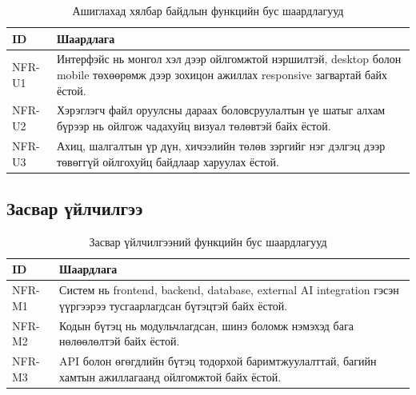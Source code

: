 \begin{table}[H]
\centering
\begin{tabular}{|p{3cm}|p{11cm}|}
\hline
\textbf{ID} & \textbf{Шаардлага} \\ \hline
NFR-U1 & Интерфэйс нь монгол хэл дээр ойлгомжтой нэршилтэй, desktop болон mobile төхөөрөмж дээр зохицон ажиллах responsive загвартай байх ёстой. \\ \hline
NFR-U2 & Хэрэглэгч файл оруулсны дараах боловсруулалтын үе шатыг алхам бүрээр нь ойлгож чадахуйц визуал төлөвтэй байх ёстой. \\ \hline
NFR-U3 & Ахиц, шалгалтын үр дүн, хичээлийн төлөв зэргийг нэг дэлгэц дээр төвөггүй ойлгохуйц байдлаар харуулах ёстой. \\ \hline
\end{tabular}
\caption{Ашиглахад хялбар байдлын функцийн бус шаардлагууд}
\end{table}

\subsection{Засвар үйлчилгээ}

\begin{table}[H]
\centering
\begin{tabular}{|p{3cm}|p{11cm}|}
\hline
\textbf{ID} & \textbf{Шаардлага} \\ \hline
NFR-M1 & Систем нь frontend, backend, database, external AI integration гэсэн үүргээрээ тусгаарлагдсан бүтэцтэй байх ёстой. \\ \hline
NFR-M2 & Кодын бүтэц нь модульчлагдсан, шинэ боломж нэмэхэд бага нөлөөлөлтэй байх ёстой. \\ \hline
NFR-M3 & API болон өгөгдлийн бүтэц тодорхой баримтжуулалттай, багийн хамтын ажиллагаанд ойлгомжтой байх ёстой. \\ \hline
\end{tabular}
\caption{Засвар үйлчилгээний функцийн бус шаардлагууд}
\end{table}
